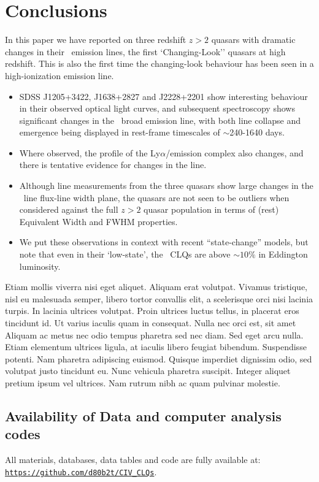 \documentclass[a4paper,fleqn,usenatbib]{mnras}
\begin{document}
\section{Conclusions}
In this paper we have reported on three redshift $z>2$ quasars with
dramatic changes in their \civ\ emission lines, the first
`Changing-Look'' quasars at high redshift.  This is also the first
time the changing-look behaviour has been seen in a high-ionization
emission line.

\begin{itemize}
  \item SDSS J1205+3422, J1638+2827 and J2228+2201 show interesting behaviour
in their observed optical light curves, and subsequent spectroscopy
shows significant changes in the \civ\ broad emission line, with both
line collapse and emergence being displayed in rest-frame timescales
of $\sim$240-1640 days.
\item Where observed, the profile of the Ly$\alpha$/\nv emission complex
also changes, and there is tentative evidence for changes in the \mgii
line.
\item Although line measurements from the three quasars show large changes
in the \civ\ line flux-line width plane, the quasars are not seen to
be outliers when considered against the full $z>2$ quasar population
in terms of (rest) Equivalent Width and FWHM properties.
\item 
We put these observations in context with recent ``state-change''
models, but note that even in their `low-state', the \civ\ CLQs are
above $\sim10\%$ in Eddington luminosity.
\end{itemize}

Etiam mollis viverra nisi eget aliquet. Aliquam erat volutpat. Vivamus
tristique, nisl eu malesuada semper, libero tortor convallis elit, a
scelerisque orci nisi lacinia turpis. In lacinia ultrices
volutpat. Proin ultrices luctus tellus, in placerat eros tincidunt
id. Ut varius iaculis quam in consequat. Nulla nec orci est, sit amet
Aliquam ac metus nec odio tempus pharetra sed nec diam. Sed eget arcu
nulla. Etiam elementum ultrices ligula, at iaculis libero feugiat
bibendum. Suspendisse potenti. Nam pharetra adipiscing
euismod. Quisque imperdiet dignissim odio, sed volutpat justo
tincidunt eu. Nunc vehicula pharetra suscipit. Integer aliquet pretium
ipsum vel ultrices. Nam rutrum nibh ac quam pulvinar molestie.



\subsection*{Availability of Data and computer analysis codes} 
All materials, databases, data tables and code are fully available at: 
\href{https://github.com/d80b2t/CIV_CLQs}{\tt https://github.com/d80b2t/CIV\_CLQs}.
\end{document}
